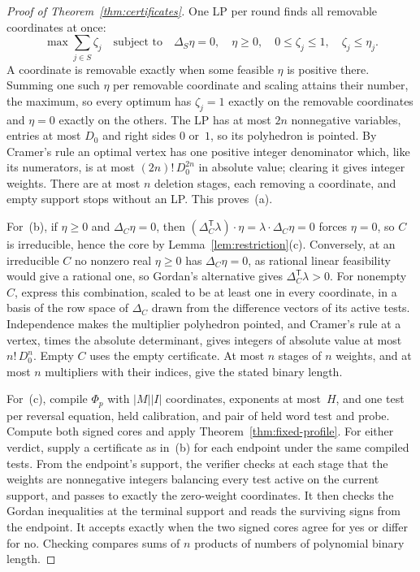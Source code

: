 \begin{proof}[Proof of Theorem~\ref{thm:certificates}]
One LP per round finds all removable coordinates at once:
\[
  \max\sum_{j\in S}\zeta_j\quad\text{subject to}\quad
  \Delta_S\eta=0,\quad \eta\ge0,\quad 0\le\zeta_j\le1,\quad \zeta_j\le\eta_j .
\]
A coordinate is removable exactly when some feasible $\eta$ is positive
there. Summing one such $\eta$ per removable coordinate and scaling
attains their number, the maximum, so every optimum has $\zeta_j=1$
exactly on the removable coordinates and $\eta=0$ exactly on the
others. The LP has at most $2n$ nonnegative variables, entries at most
$D_0$ and right sides $0$ or~$1$, so its polyhedron is pointed. By
Cramer's rule an optimal vertex has one positive integer denominator
which, like its numerators, is at most $(2n)!\,D_0^{2n}$ in absolute
value; clearing it gives integer weights. There are at most $n$ deletion
stages, each removing a coordinate, and empty support stops without an LP.
This proves~(a).

For~(b), if $\eta\ge0$ and $\Delta_C\eta=0$, then
$(\Delta_C^{\mathsf T}\lambda)\cdot\eta=\lambda\cdot\Delta_C\eta=0$ forces
$\eta=0$, so $C$ is irreducible, hence the core by
Lemma~\ref{lem:restriction}(c). Conversely, at an irreducible $C$ no
nonzero real $\eta\ge0$ has $\Delta_C\eta=0$, as rational linear
feasibility would give a rational one, so Gordan's alternative gives
$\Delta_C^{\mathsf T}\lambda>0$. For nonempty $C$, express this
combination, scaled to be at least one in every coordinate, in a basis of
the row space of $\Delta_C$ drawn from the difference vectors of its
active tests. Independence makes the multiplier polyhedron pointed, and
Cramer's rule at a vertex, times the absolute determinant, gives integers
of absolute value at most $n!\,D_0^n$. Empty $C$ uses the empty
certificate. At most $n$ stages of $n$ weights, and at most $n$
multipliers with their indices, give the stated binary length.

For~(c), compile $\Phi_p$ with $|M||I|$ coordinates, exponents at most~$H$,
and one test per reversal equation, held calibration, and pair of held word
test and probe. Compute both signed cores and apply
Theorem~\ref{thm:fixed-profile}. For either verdict, supply a certificate
as in~(b) for each endpoint under the same compiled tests. From the
endpoint's support, the verifier checks at each stage that the weights are
nonnegative integers balancing every test active on the current support,
and passes to exactly the zero-weight coordinates. It then checks the Gordan
inequalities at the terminal support and reads the surviving signs from
the endpoint. It accepts exactly when the two signed cores agree for yes or
differ for no. Checking compares sums of $n$ products of numbers of
polynomial binary length.
\end{proof}

